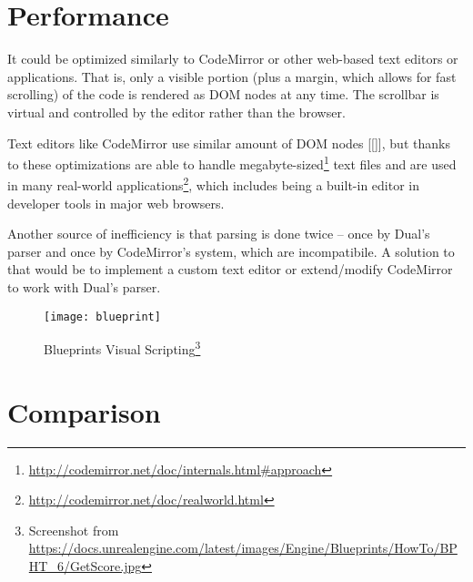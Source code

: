 \section{Performance}
It could be optimized similarly to CodeMirror or other web-based text editors or
applications. That is, only a visible portion (plus a margin, which allows for
fast scrolling) of the code is rendered as DOM nodes at any time. The scrollbar
is virtual and controlled by the editor rather than the browser.

Text editors like CodeMirror use similar amount of DOM nodes [[]], but thanks to
these optimizations are able to handle
megabyte-sized\footnote{\url{http://codemirror.net/doc/internals.html\#approach}}
text files and are used in many real-world
applications\footnote{\url{http://codemirror.net/doc/realworld.html}}, which
includes being a built-in editor in developer tools in major web browsers.

Another source of inefficiency is that parsing is done twice -- once by Dual's
parser and once by CodeMirror's system, which are incompatibile.  A solution to
that would be to implement a custom text editor or extend/modify CodeMirror to
work with Dual's parser.


\begin{figure}[h!]
\centering \texttt{[image: blueprint]}
\caption{Blueprints Visual Scripting\protect\footnote{Screenshot from
    \url{https://docs.unrealengine.com/latest/images/Engine/Blueprints/HowTo/BPHT_6/GetScore.jpg}}}
\label{fig:blueprint}
\end{figure}

\section{Comparison}

